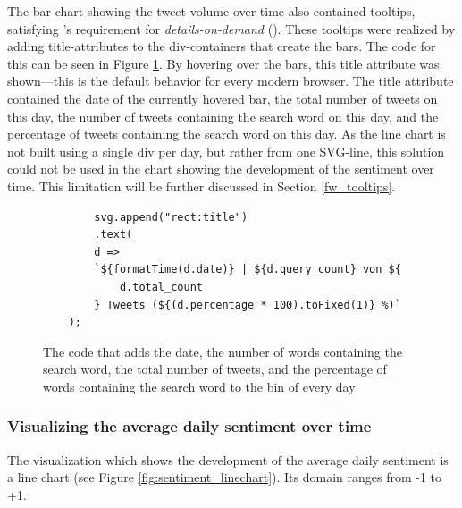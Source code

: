 The bar chart showing the tweet volume over time also contained tooltips, satisfying \citeauthor{shneidermanEyesHaveIt1996}'s requirement for \emph{details-on-demand} (\cite{shneidermanEyesHaveIt1996}). These tooltips were realized by adding title-attributes to the div-containers that create the bars. The code for this can be seen in Figure \ref{code:details_title}. By hovering over the bars, this title attribute was shown---this is the default behavior for every modern browser. The title attribute contained the date of the currently hovered bar, the total number of tweets on this day, the number of tweets containing the search word on this day, and the percentage of tweets containing the search word on this day. As the line chart is not built using a single div per day, but rather from one SVG-line, this solution could not be used in the chart showing the development of the sentiment over time. This limitation will be further discussed in Section \ref{fw_tooltips}.

\begin{figure}[h!]
    \begin{verbatim}
        svg.append("rect:title")
        .text(
        d =>
        `${formatTime(d.date)} | ${d.query_count} von ${
            d.total_count
        } Tweets (${(d.percentage * 100).toFixed(1)} %)`
    );
    \end{verbatim}
    \caption{The code that adds the date, the number of words containing the search word, the total number of tweets, and the percentage of words containing the search word to the bin of every day}
    \label{code:details_title}
\end{figure}

\subsubsection{Visualizing the average daily sentiment over time}
The visualization which shows the development of the average daily sentiment is a line chart (see Figure \ref{fig:sentiment_linechart}). Its domain ranges from -1 to +1.

